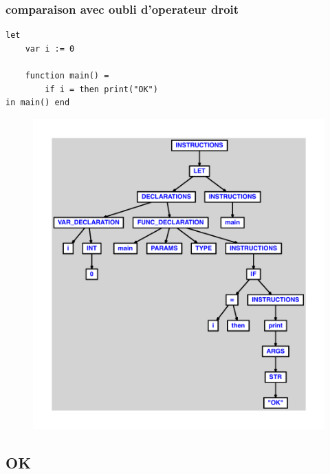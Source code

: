 \documentclass{article}
\begin{document}
\subsubsection{comparaison avec oubli d'operateur droit}
\begin{lstlisting}
let
	var i := 0

	function main() =
		if i = then print("OK")
in main() end
\end{lstlisting}
\newpage
\begin{figure}[H]
\centering
\includegraphics[max width=\textwidth]{ast/ast_166.pdf}
\end{figure}
\newpage
\subsection{OK}
\end{document}
